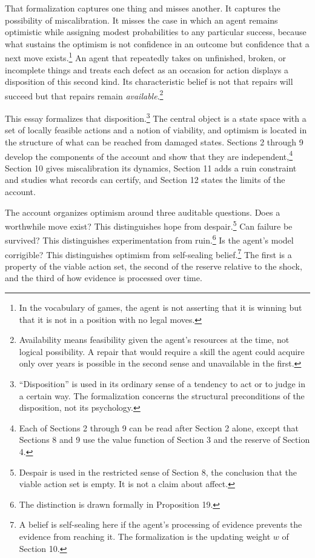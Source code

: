 \documentclass[11pt]{article}
\theoremstyle{remark}
\begin{document}
That formalization captures one thing and misses another. It captures the possibility of miscalibration. It misses the case in which an agent remains optimistic while assigning modest probabilities to any particular success, because what sustains the optimism is not confidence in an outcome but confidence that a next move exists.\footnote{In the vocabulary of games, the agent is not asserting that it is winning but that it is not in a position with no legal moves.} An agent that repeatedly takes on unfinished, broken, or incomplete things and treats each defect as an occasion for action displays a disposition of this second kind. Its characteristic belief is not that repairs will succeed but that repairs remain \emph{available}.\footnote{Availability means feasibility given the agent's resources at the time, not logical possibility. A repair that would require a skill the agent could acquire only over years is possible in the second sense and unavailable in the first.}

This essay formalizes that disposition.\footnote{``Disposition'' is used in its ordinary sense of a tendency to act or to judge in a certain way. The formalization concerns the structural preconditions of the disposition, not its psychology.} The central object is a state space with a set of locally feasible actions and a notion of viability, and optimism is located in the structure of what can be reached from damaged states. Sections 2 through 9 develop the components of the account and show that they are independent,\footnote{Each of Sections 2 through 9 can be read after Section 2 alone, except that Sections 8 and 9 use the value function of Section 3 and the reserve of Section 4.} Section 10 gives miscalibration its dynamics, Section 11 adds a ruin constraint and studies what records can certify, and Section 12 states the limits of the account.

The account organizes optimism around three auditable questions. Does a worthwhile move exist? This distinguishes hope from despair.\footnote{Despair is used in the restricted sense of Section 8, the conclusion that the viable action set is empty. It is not a claim about affect.} Can failure be survived? This distinguishes experimentation from ruin.\footnote{The distinction is drawn formally in Proposition 19.} Is the agent's model corrigible? This distinguishes optimism from self-sealing belief.\footnote{A belief is self-sealing here if the agent's processing of evidence prevents the evidence from reaching it. The formalization is the updating weight $w$ of Section 10.} The first is a property of the viable action set, the second of the reserve relative to the shock, and the third of how evidence is processed over time.
\end{document}
